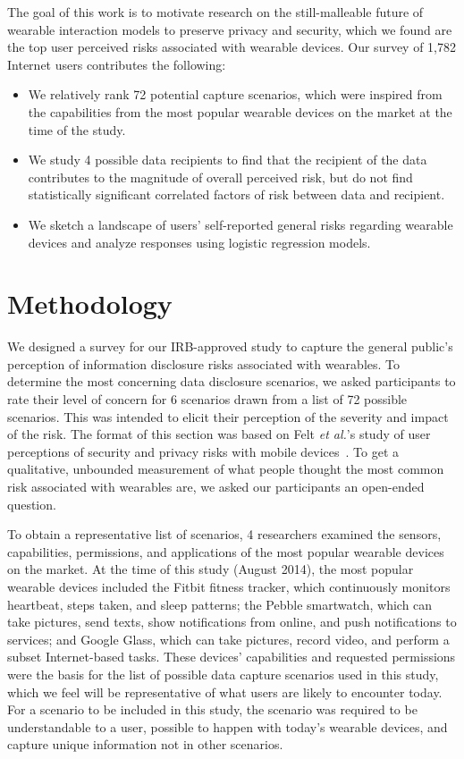 \documentclass[conference]{IEEEtran}
\begin{document}
The goal of this work is to motivate research on the still-malleable future of wearable interaction models to preserve privacy and security, which we found are the top user perceived risks associated with wearable devices.  Our survey of 1,782 Internet users contributes the following: %

\begin{itemize} \itemsep1pt \parskip0pt 
\item We relatively rank 72 potential capture scenarios, which were inspired from the capabilities from the most popular wearable devices on the market at the time of the study. 
\item We study 4 possible data recipients to find that the recipient of the data contributes to the magnitude of overall perceived risk, but do not find statistically significant correlated factors of risk between data and recipient. 
\item We sketch a landscape of users' self-reported general risks regarding wearable devices and analyze responses using logistic regression models. 
\end{itemize}

\section{Methodology}
We designed a survey for our IRB-approved study to capture the general public's perception of information disclosure risks associated with wearables. To determine the most concerning data disclosure scenarios, we asked participants to rate their level of concern for 6 scenarios drawn from a list of 72 possible scenarios. This was intended to elicit their perception of the severity and impact of the risk. The format of this section was based on Felt {\it et al.}'s study of user perceptions of security and privacy risks with mobile devices~\cite{Felt}. To get a qualitative, unbounded measurement of what people thought the most common risk associated with wearables are, we asked our participants an open-ended question. 

To obtain a representative list of scenarios, 4 researchers examined the sensors, capabilities, permissions, and applications of the most popular wearable devices on the market. At the time of this study (August 2014), the most popular wearable devices included the Fitbit fitness tracker, which continuously monitors heartbeat, steps taken, and sleep patterns; the Pebble smartwatch, which can take pictures, send texts, show notifications from online, and push notifications to services; and Google Glass, which can take pictures, record video, and perform a subset Internet-based tasks. These devices' capabilities and requested permissions were the basis for the list of possible data capture scenarios used in this study, which we feel will be representative of what users are likely to encounter today. For a scenario to be included in this study, the scenario was required to be understandable to a user, possible to happen with today's wearable devices, and capture unique information not in other scenarios. 
\end{document}
